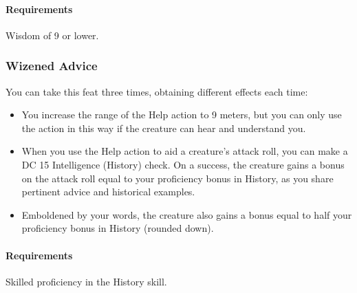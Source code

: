     \paragraph{Requirements} Wisdom of 9 or lower.
%
%
%
\subsubsection{Wizened Advice} \label{feat::wizenedadvice}
    You can take this feat three times, obtaining different effects each time:
    \begin{itemize}
        \item You increase the range of the Help action to 9 meters, but you can only use the action in this way if the creature can hear and understand you.
        \item When you use the Help action to aid a creature's attack roll, you can make a DC 15 Intelligence (History) check.
        On a success, the creature gains a bonus on the attack roll equal to your proficiency bonus in History, as you share pertinent advice and historical examples.
        \item Emboldened by your words, the creature also gains a bonus equal to half your proficiency bonus in History (rounded down).
    \end{itemize}
    \paragraph{Requirements} Skilled proficiency in the History skill.
